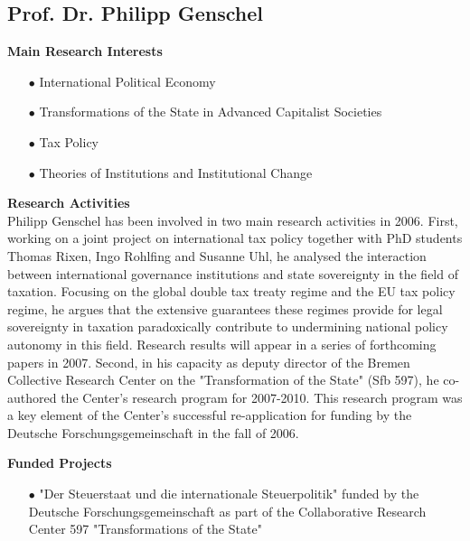 \subsection{Prof. Dr. Philipp Genschel}


\textbf{Main Research Interests}\\[-0.25cm]
\begin{enumerate}
\item[$\bullet$]	International Political Economy
\item[$\bullet$]	Transformations of the State in Advanced Capitalist Societies
\item[$\bullet$]	Tax Policy
\item[$\bullet$]	Theories of Institutions and Institutional Change
\end{enumerate}


\vspace{0.6cm}
\textbf{Research Activities}\\[-0.25cm]

Philipp Genschel has been involved in two main research activities in 2006. First, working on a joint project on international tax policy together with PhD students Thomas Rixen, Ingo Rohlfing and Susanne Uhl, he analysed the interaction between international governance institutions and state sovereignty in the field of taxation. Focusing on the global double tax treaty regime and the EU tax policy regime, he argues that the extensive guarantees these regimes provide for legal sovereignty in taxation paradoxically contribute to undermining national policy autonomy in this field. Research results will appear in a series of forthcoming papers in 2007. Second, in his capacity as deputy director of the Bremen Collective Research Center on the "Transformation of the State" (Sfb 597), he co-authored the Center's research program for 2007-2010. This research program was a key element of the Center's successful re-application for funding by the Deutsche Forschungsgemeinschaft in the fall of 2006.


\vspace{0.6cm}
\textbf{Funded Projects}\\[-0.25cm]
\begin{enumerate}
\item[$\bullet$]	"Der Steuerstaat und die internationale Steuerpolitik"\newline
	funded by the Deutsche Forschungsgemeinschaft as part of the 	Collaborative Research Center 597 "Transformations of the State"
\end{enumerate}


